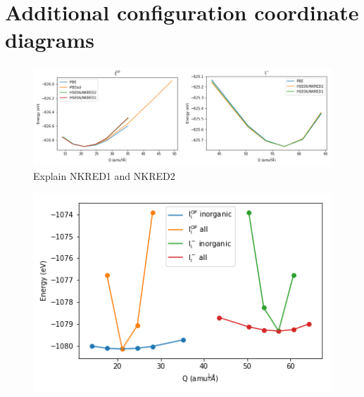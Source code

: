 \chapter{\label{app:9-configcoord}Additional configuration coordinate diagrams}

\begin{figure}[h!]   %
\centering
  \includegraphics[width=0.7\columnwidth]{figures/ap9/cc_theory.png}
  \caption[]{Explain NKRED1 and NKRED2}
\label{schrodinger}
\end{figure}


\begin{figure}[h!]   %
\centering
  \includegraphics[width=0.7\columnwidth]{figures/ap9/organic_inorganic.png}
  \caption[]{}
\label{schrodinger}
\end{figure}
